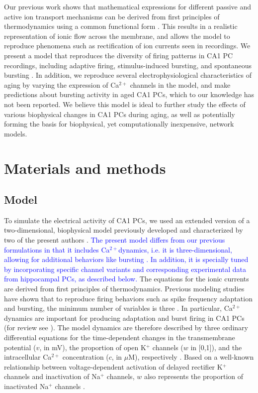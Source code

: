 \documentclass[10pt,letterpaper]{article}
\newcommand{\Ca}{Ca$^{2+}$}
\newcommand{\K}{K$^{+}$}
\newcommand{\Na}{Na$^{+}$}
\newcommand{\edit}[1]{\textcolor{blue}{#1}}
\begin{document}
Our previous work shows that mathematical expressions for different passive and active ion transport mechanisms can be derived from first principles of thermodynamics \cite{herrera2012membranes,herrera2013relating} using a common functional form \cite{herrera2018thermodynamic}. This results in a realistic representation of ionic flow across the membrane, and allows the model to reproduce phenomena such as rectification of ion currents seen in recordings. We present a model that reproduces the diversity of firing patterns in CA1 PC recordings, including adaptive firing, stimulus-induced bursting, and spontaneous bursting \cite{mckiernan2017ca1}. In addition, we reproduce several electrophysiological characteristics of aging by varying the expression of Ca$^{2+}$ channels in the model, and make predictions about bursting activity in aged CA1 PCs, which to our knowledge has not been reported. We believe this model is ideal to further study the effects of various biophysical changes in CA1 PCs during aging, as well as potentially forming the basis for biophysical, yet computationally inexpensive, network models.

\section*{Materials and methods}

\subsection*{Model}
To simulate the electrical activity of CA1 PCs, we used an extended version of a two-dimensional, biophysical model previously developed and characterized by two of the present authors  \cite{herrera2012membranes,herrera2013relating,herrera2018thermodynamic}. \edit{The present model differs from our previous formulations in that it includes \Ca dynamics, i.e. it is three-dimensional, allowing for additional behaviors like bursting \cite{avron1993basic}. In addition, it is specially tuned by incorporating specific channel variants and corresponding experimental data from hippocampal PCs, as described below.} The equations for the ionic currents are derived from first principles of thermodynamics. Previous modeling studies have shown that to reproduce firing behaviors such as spike frequency adaptation and bursting, the minimum number of variables is three \cite{hindmarsh1984model,avron1993basic}. 
In particular, {\Ca} dynamics are important for producing adaptation and burst firing in CA1 PCs (for review see \cite{mckiernan2017ca1}). 
The model dynamics are therefore described by three ordinary differential equations for the time-dependent changes in the transmembrane potential ($v$, in mV), the proportion of open {\K} channels ($w$ in [0,1]), and the intracellular {\Ca} concentration ($c$, in $\mu$M), respectively   \cite{herrera2018thermodynamic}. Based on a well-known relationship between voltage-dependent activation of delayed rectifier {\K} channels and inactivation of {\Na} channels, $w$ also represents the proportion of inactivated {\Na} channels \cite{rinzel1985excitation,avron1991minimal}.
\end{document}
